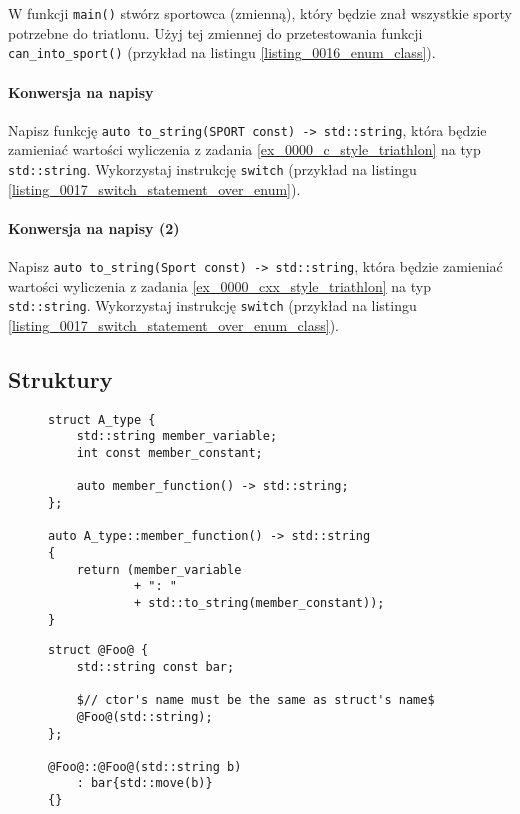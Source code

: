 \documentclass[11pt,a4paper,titlepage,onecolumn]{article}
\begin{document}
W funkcji \texttt{main()} stwórz sportowca (zmienną), który będzie znał
wszystkie sporty potrzebne do triatlonu. Użyj tej zmiennej do przetestowania
funkcji \texttt{can\_into\_sport()} (przykład na listingu
\ref{listing_0016_enum_class}).

\paragraph{Konwersja na napisy} Napisz funkcję \texttt{auto to\_string(SPORT
const) -> std::string}, która będzie zamieniać wartości
wyliczenia z zadania \ref{ex_0000_c_style_triathlon} na typ
\texttt{std::string}. Wykorzystaj instrukcję \texttt{switch} (przykład na
listingu \ref{listing_0017_switch_statement_over_enum}).

\paragraph{Konwersja na napisy (2)} Napisz \texttt{auto to\_string(Sport
const) -> std::string}, która będzie zamieniać wartości
wyliczenia z zadania \ref{ex_0000_cxx_style_triathlon} na typ
\texttt{std::string}. Wykorzystaj instrukcję \texttt{switch} (przykład na
listingu \ref{listing_0017_switch_statement_over_enum_class}).

\subsection{Struktury}

\begin{figure}
{\small
\begin{lstlisting}[caption={struct},
    captionpos=b,
    label=listing_0010_struct]
struct A_type {
    std::string member_variable;
    int const member_constant;

    auto member_function() -> std::string;
};

auto A_type::member_function() -> std::string
{
    return (member_variable
            + ": "
            + std::to_string(member_constant));
}
\end{lstlisting}}
\end{figure}

\begin{figure}
{\small
\begin{lstlisting}[caption={konstruktor},
    captionpos=b,
    label=listing_0011_ctor]
struct @Foo@ {
    std::string const bar;

    $// ctor's name must be the same as struct's name$
    @Foo@(std::string);
};

@Foo@::@Foo@(std::string b)
    : bar{std::move(b)}
{}
\end{lstlisting}}
\end{figure}
\end{document}
